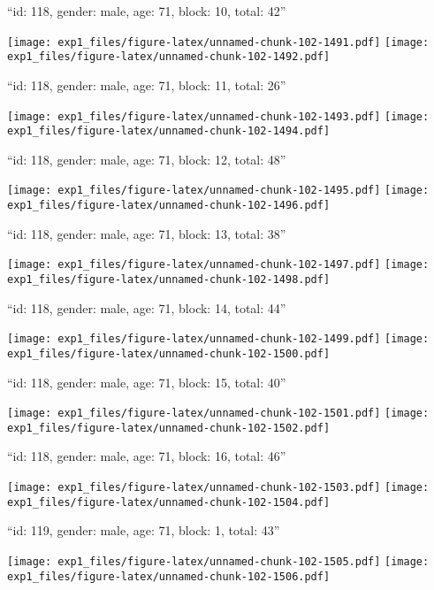 \documentclass[11pt,,]{article}
\begin{document}
\newpage
[1] 

``id: 118, gender: male, age: 71, block: 10, total: 42''

\texttt{[image: exp1\_files/figure-latex/unnamed-chunk-102-1491.pdf]}
\texttt{[image: exp1\_files/figure-latex/unnamed-chunk-102-1492.pdf]}

\newpage
[1] 

``id: 118, gender: male, age: 71, block: 11, total: 26''

\texttt{[image: exp1\_files/figure-latex/unnamed-chunk-102-1493.pdf]}
\texttt{[image: exp1\_files/figure-latex/unnamed-chunk-102-1494.pdf]}

\newpage
[1] 

``id: 118, gender: male, age: 71, block: 12, total: 48''

\texttt{[image: exp1\_files/figure-latex/unnamed-chunk-102-1495.pdf]}
\texttt{[image: exp1\_files/figure-latex/unnamed-chunk-102-1496.pdf]}

\newpage
[1] 

``id: 118, gender: male, age: 71, block: 13, total: 38''

\texttt{[image: exp1\_files/figure-latex/unnamed-chunk-102-1497.pdf]}
\texttt{[image: exp1\_files/figure-latex/unnamed-chunk-102-1498.pdf]}

\newpage
[1] 

``id: 118, gender: male, age: 71, block: 14, total: 44''

\texttt{[image: exp1\_files/figure-latex/unnamed-chunk-102-1499.pdf]}
\texttt{[image: exp1\_files/figure-latex/unnamed-chunk-102-1500.pdf]}

\newpage
[1] 

``id: 118, gender: male, age: 71, block: 15, total: 40''

\texttt{[image: exp1\_files/figure-latex/unnamed-chunk-102-1501.pdf]}
\texttt{[image: exp1\_files/figure-latex/unnamed-chunk-102-1502.pdf]}

\newpage
[1] 

``id: 118, gender: male, age: 71, block: 16, total: 46''

\texttt{[image: exp1\_files/figure-latex/unnamed-chunk-102-1503.pdf]}
\texttt{[image: exp1\_files/figure-latex/unnamed-chunk-102-1504.pdf]}

\newpage
[1] 

``id: 119, gender: male, age: 71, block: 1, total: 43''

\texttt{[image: exp1\_files/figure-latex/unnamed-chunk-102-1505.pdf]}
\texttt{[image: exp1\_files/figure-latex/unnamed-chunk-102-1506.pdf]}
\end{document}
